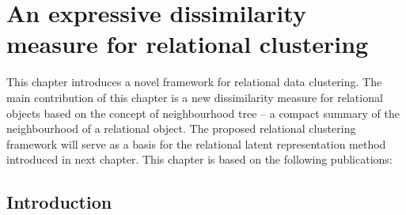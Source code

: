 \chapter{An expressive dissimilarity measure for relational clustering}\label{ch:clustering}


This chapter introduces a novel framework for relational data clustering. 
The main contribution of this chapter is a new dissimilarity measure for relational objects based on the concept of neighbourhood tree -- a compact summary of the neighbourhood of a relational object.
The proposed relational clustering framework will serve as a basis for the relational latent representation method introduced in next chapter.
This chapter is based on the following publications:

\begin{quote}
\end{quote}

\begin{quote}
\end{quote}




\section{Introduction}




